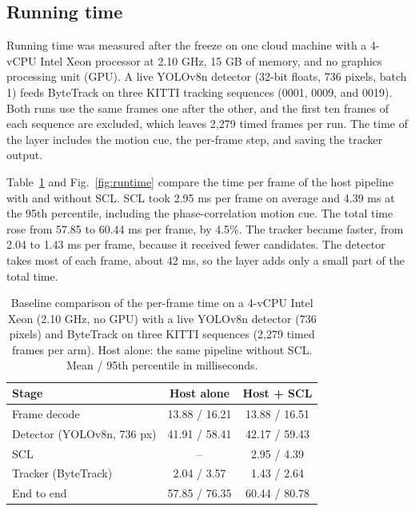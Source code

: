 \documentclass[pdflatex,referee,sn-mathphys-num]{sn-jnl}
\newcommand{\scl}{SCL}
\begin{document}
\subsection{Running time}\label{sec:latency}
\label{sec:latency-setup}Running time was measured after the freeze on one cloud machine with a 4-vCPU
Intel Xeon processor at 2.10 GHz, 15 GB of memory, and no graphics processing unit (GPU). A live YOLOv8n
detector (32-bit floats, 736 pixels, batch 1) feeds ByteTrack on three KITTI
tracking sequences (0001, 0009, and 0019). Both runs use the same frames
one after the other, and the first ten frames of each sequence are excluded,
which leaves 2,279 timed frames per run. The time of the layer includes the
motion cue, the per-frame step, and saving the tracker output.

Table~\ref{tab:runtime} and Fig.~\ref{fig:runtime} compare the time per frame
of the host pipeline with and without \scl{}. \scl{} took 2.95 ms per
frame on average and 4.39 ms at the 95th percentile, including the
phase-correlation motion cue. The total time rose from 57.85 to 60.44 ms
per frame, by 4.5\%. The tracker became faster, from 2.04 to 1.43 ms per
frame, because it received fewer candidates. The detector takes most of each
frame, about 42 ms, so the layer adds only a small part of the total time.

\begin{table}[t]
\caption{Baseline comparison of the per-frame time on a 4-vCPU Intel Xeon
(2.10 GHz, no GPU) with a live YOLOv8n detector (736 pixels) and ByteTrack on
three KITTI sequences (2,279 timed frames per arm). Host alone: the same
pipeline without \scl{}. Mean / 95th percentile in milliseconds.}
\label{tab:runtime}
\centering\footnotesize
\setlength{\tabcolsep}{4pt}
\begin{tabular}{@{}lcc@{}}
\toprule
Stage & Host alone & Host + \scl{}\\
\midrule
Frame decode & 13.88 / 16.21 & 13.88 / 16.51\\
Detector (YOLOv8n, 736 px) & 41.91 / 58.41 & 42.17 / 59.43\\
\scl{} & -- & 2.95 / 4.39\\
Tracker (ByteTrack) & 2.04 / 3.57 & 1.43 / 2.64\\
End to end & 57.85 / 76.35 & 60.44 / 80.78\\
\bottomrule
\end{tabular}
\end{table}
\end{document}

